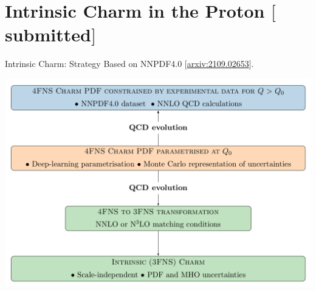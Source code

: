 \documentclass[9pt]{beamer}
\providecommand{\iRef}[1]{{\color{mLightGreen}\small $[$#1$]$}}
\begin{document}
\section{Intrinsic Charm in the Proton \iRef{submitted}}

\begin{frame}{Intrinsic Charm: Strategy}
    Based on NNPDF4.0 \iRef{\href{https://arxiv.org/abs/2109.02653}{arxiv:2109.02653}}.

	\begin{center}
        \includegraphics[scale=.6]{strategy.png}
	\end{center}
\end{frame}
\end{document}

